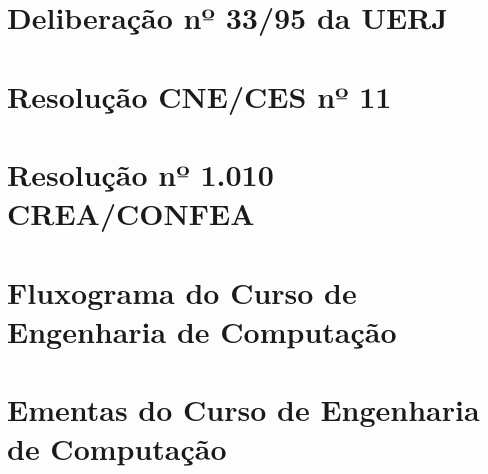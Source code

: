 \chapter{Deliberação nº 33/95 da UERJ}
\label{delib3395}
%


\chapter{Resolução CNE/CES nº 11}
\label{cne11}

%

\chapter{Resolução nº 1.010 CREA/CONFEA}
\label{res1010}








\chapter{Fluxograma do Curso de Engenharia de Computação}
\label{fluxograma}

\chapter{Ementas do Curso de Engenharia de Computação}
\label{ementas}






